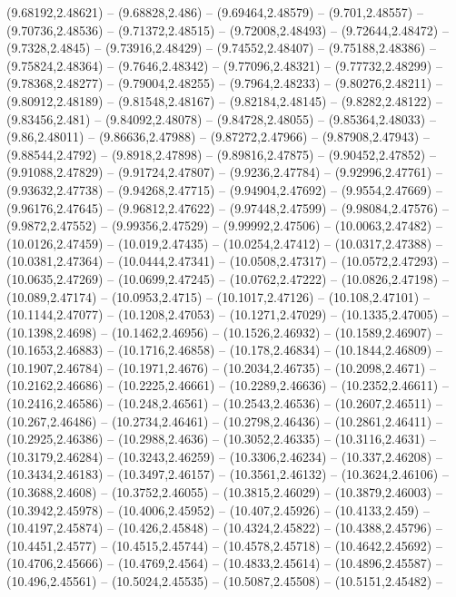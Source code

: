 {(9.68192,2.48621) -- (9.68828,2.486) -- (9.69464,2.48579) -- (9.701,2.48557) -- (9.70736,2.48536) -- (9.71372,2.48515) -- (9.72008,2.48493) -- (9.72644,2.48472) -- (9.7328,2.4845) -- (9.73916,2.48429) -- (9.74552,2.48407) -- (9.75188,2.48386) --
(9.75824,2.48364) -- (9.7646,2.48342) -- (9.77096,2.48321) -- (9.77732,2.48299) -- (9.78368,2.48277) -- (9.79004,2.48255) -- (9.7964,2.48233) -- (9.80276,2.48211) -- (9.80912,2.48189) -- (9.81548,2.48167) -- (9.82184,2.48145) -- (9.8282,2.48122) --
(9.83456,2.481) -- (9.84092,2.48078) -- (9.84728,2.48055) -- (9.85364,2.48033) -- (9.86,2.48011) -- (9.86636,2.47988) -- (9.87272,2.47966) -- (9.87908,2.47943) -- (9.88544,2.4792) -- (9.8918,2.47898) -- (9.89816,2.47875) -- (9.90452,2.47852) --
(9.91088,2.47829) -- (9.91724,2.47807) -- (9.9236,2.47784) -- (9.92996,2.47761) -- (9.93632,2.47738) -- (9.94268,2.47715) -- (9.94904,2.47692) -- (9.9554,2.47669) -- (9.96176,2.47645) -- (9.96812,2.47622) -- (9.97448,2.47599) -- (9.98084,2.47576) --
(9.9872,2.47552) -- (9.99356,2.47529) -- (9.99992,2.47506) -- (10.0063,2.47482) -- (10.0126,2.47459) -- (10.019,2.47435) -- (10.0254,2.47412) -- (10.0317,2.47388) -- (10.0381,2.47364) -- (10.0444,2.47341) -- (10.0508,2.47317) -- (10.0572,2.47293) --
(10.0635,2.47269) -- (10.0699,2.47245) -- (10.0762,2.47222) -- (10.0826,2.47198) -- (10.089,2.47174) -- (10.0953,2.4715) -- (10.1017,2.47126) -- (10.108,2.47101) -- (10.1144,2.47077) -- (10.1208,2.47053) -- (10.1271,2.47029) -- (10.1335,2.47005) --
(10.1398,2.4698) -- (10.1462,2.46956) -- (10.1526,2.46932) -- (10.1589,2.46907) -- (10.1653,2.46883) -- (10.1716,2.46858) -- (10.178,2.46834) -- (10.1844,2.46809) -- (10.1907,2.46784) -- (10.1971,2.4676) -- (10.2034,2.46735) -- (10.2098,2.4671) --
(10.2162,2.46686) -- (10.2225,2.46661) -- (10.2289,2.46636) -- (10.2352,2.46611) -- (10.2416,2.46586) -- (10.248,2.46561) -- (10.2543,2.46536) -- (10.2607,2.46511) -- (10.267,2.46486) -- (10.2734,2.46461) -- (10.2798,2.46436) -- (10.2861,2.46411) --
(10.2925,2.46386) -- (10.2988,2.4636) -- (10.3052,2.46335) -- (10.3116,2.4631) -- (10.3179,2.46284) -- (10.3243,2.46259) -- (10.3306,2.46234) -- (10.337,2.46208) -- (10.3434,2.46183) -- (10.3497,2.46157) -- (10.3561,2.46132) -- (10.3624,2.46106) --
(10.3688,2.4608) -- (10.3752,2.46055) -- (10.3815,2.46029) -- (10.3879,2.46003) -- (10.3942,2.45978) -- (10.4006,2.45952) -- (10.407,2.45926) -- (10.4133,2.459) -- (10.4197,2.45874) -- (10.426,2.45848) -- (10.4324,2.45822) -- (10.4388,2.45796) --
(10.4451,2.4577) -- (10.4515,2.45744) -- (10.4578,2.45718) -- (10.4642,2.45692) -- (10.4706,2.45666) -- (10.4769,2.4564) -- (10.4833,2.45614) -- (10.4896,2.45587) -- (10.496,2.45561) -- (10.5024,2.45535) -- (10.5087,2.45508) -- (10.5151,2.45482) --
}
